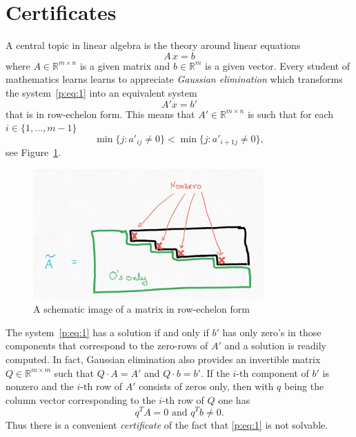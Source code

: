 \section{Certificates}
\label{sec:certificates}


A central topic in linear algebra is the theory around  linear equations 
\begin{equation} 
\label{p:eq:1}
  A \, x = b
\end{equation}
where $A ∈ ℝ^{m×n}$ is a given matrix and $b ∈ ℝ^m$ is a given vector. Every student of mathematics learns learns to appreciate \emph{Gaussian elimination} which transforms the system~\eqref{p:eq:1}  into an equivalent system  
\begin{displaymath}
  {A}' x = {b}'
\end{displaymath}
that is in row-echelon form. This means that ${A}' ∈ ℝ^{m×n}$ is such that 
  for each $i ∈ \{ 1,\dots , m-1\}$
  \begin{displaymath}
    \min\{ j : {a}'_{ij} \neq 0\} <  \min\{ j : {a}'_{i+1j} \neq 0\},
  \end{displaymath}
see Figure~\ref{fig:8}. 


\begin{figure}
  \centering
 \includegraphics[height=5cm]{figures/RowEchelon.jpg}
  \caption{A schematic image of a matrix in row-echelon form} 
\label{fig:8}
\end{figure}


The system~\eqref{p:eq:1} has a solution if and only if ${b}'$ has only zero's in those components that correspond to the zero-rows of ${A}'$ and a solution is readily computed. In fact, Gaussian elimination also provides an invertible matrix $Q ∈ ℝ^{m ×m}$ such that $Q\cdot A = {A}'$ and $Q \cdot b = {b}'$. If the $i$-th component of ${b}'$ is nonzero and the $i$-th row of ${A}'$ consists of zeros only, then with $q$ being the column vector corresponding to the $i$-th row of $Q$ one has 
\begin{displaymath}
  q^T A = 0 \text{ and } q^Tb \neq 0. 
\end{displaymath}
Thus there is a convenient \emph{certificate} of the fact that \eqref{p:eq:1} is not solvable. 


